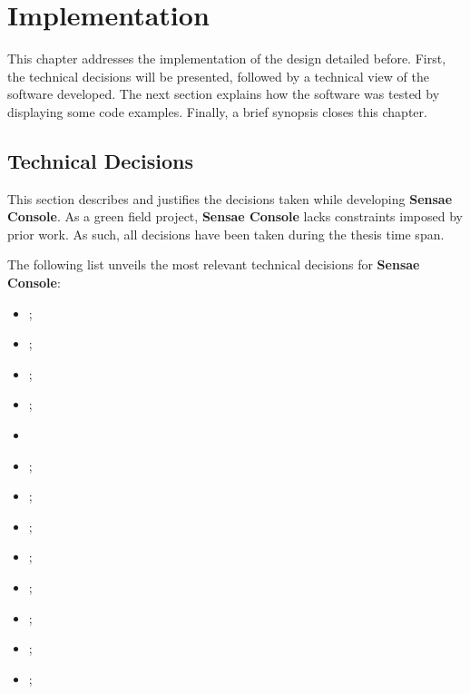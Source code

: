 \chapter{Implementation}
\label{chap:implementation}

This chapter addresses the implementation of the design detailed before. First, the technical decisions will be presented, followed by a technical view of the software developed. The next section explains how the software was tested by displaying some code examples. Finally, a brief synopsis closes this chapter.

\section{Technical Decisions}
\label{sec:implementation:decisions}

This section describes and justifies the decisions taken while developing \textbf{Sensae Console}.
As a green field project, \textbf{Sensae Console} lacks constraints imposed by prior work. As such, all decisions have been taken during the thesis time span.

The following list unveils the most relevant technical decisions for \textbf{Sensae Console}:

\begin{itemize}
    \item {};
    \item {};
    \item {};
    \item {};
    \item {}
    \item {};
    \item {};
    \item {};
    \item {};
    \item {};
    \item {};
    \item {};
    \item {};
\end{itemize}

